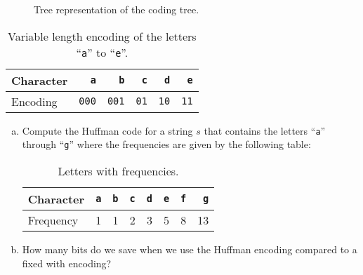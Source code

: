 \begin{figure}[!ht]
  \centering
  \caption{Tree representation of the coding tree.}
  \label{fig:coding-tree2}
\end{figure}



\begin{table}[htbp]
  \centering
\begin{tabular}[t]{|l|r|r|r|r|r|}
\hline
Character &   \texttt{a} &   \texttt{b} & \texttt{c}  & \texttt{d}  & \texttt{e}   \\
\hline
\hline
Encoding & \texttt{000} & \texttt{001} & \texttt{01} & \texttt{10} & \texttt{11} \\
\hline
\end{tabular}
  \caption{Variable length encoding of the letters ``\texttt{a}'' to ``\texttt{e}''.}
  \label{tab:coding2}
\end{table}
\pagebreak

\exercise
\begin{enumerate}[(a)]
\item Compute the Huffman code for a string $s$ that contains the letters 
      ``\texttt{a}'' through ``\texttt{g}'' where the frequencies are given by the following table:

\begin{table}[htbp]
  \centering
\begin{tabular}[t]{|l|r|r|r|r|r|r|r|}
\hline
Character  & \texttt{a} & \texttt{b} & \texttt{c} & \texttt{d} & \texttt{e} & \texttt{f} & \texttt{g} \\
\hline
\hline
Frequency &          1 &          1 &          2 &          3 &          5 &         8 &         13 \\
\hline
\end{tabular}
  \caption{Letters with frequencies.}
  \label{tab:aufgabe-huffman}
\end{table}

\item How many bits do we save when we use the Huffman encoding compared to a fixed with encoding?
      \eox
\end{enumerate}



